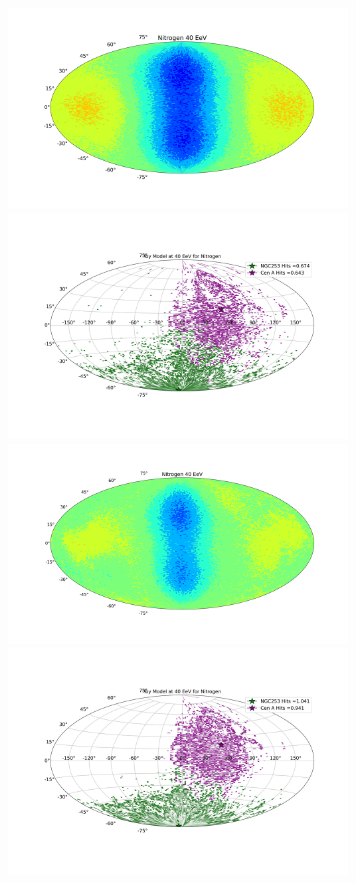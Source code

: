 \documentclass[12pt, a4 paper]{article}
\begin{document}
\begin{figure}[t]
\includegraphics[width=9.0cm]{Images/Log_Bins_180_Historgam_BF_N2_Str_Tur_TM_40_EeV.png}
\includegraphics[width=9.0cm]{Images/Bins_180_BF_N2_CenA_NGC253_Str_Tur_TM_40_EeV.png}
\includegraphics[width=9.0cm]{Images/Log_Bins_180_Historgam_LB_N2_Str_Tur_TM_40_EeV.png}
\includegraphics[width=9.0cm]{Images/Bins_180_LB_N2_CenA_NGC253_Str_Tur_TM_40_EeV.png}

\end{figure}
\end{document}
